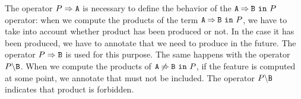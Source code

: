 The operator $\mandatory{A}{P}$ is necessary to define the behavior
of the $\require{A}{B}{P}$ operator:
when we compute the products of the term $\require{A}{B}{P}$, we have
to take into account whether  product   has been produced or not.
In the case it has been produced, we have to annotate
that we need to produce  in the future.
The operator $\mandatory{B}{P}$  is used for this purpose.
The same happens with  the operator $\forbid{B}{P}$.
When we  compute the products of $\exclude{A}{B}{P}$,
if the feature  is computed
at some point, we  annotate
that  must not be included. The operator $\forbid{B}{P}$ indicates
that product  is forbidden.































